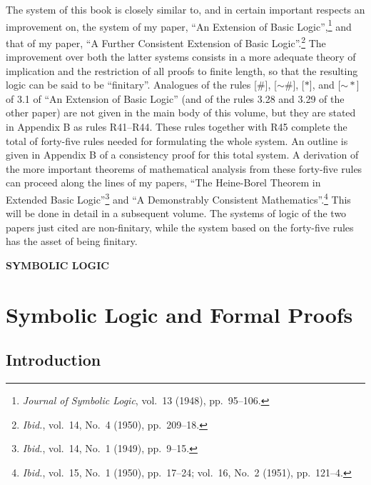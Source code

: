 \documentclass{book}
\renewcommand*{\neg}{\mathord{\sim}}
\begin{document}
The system of this book is closely similar to, and in certain important respects an improvement on, the system of my paper, “An Extension of Basic Logic”,\footnote{\textit{Journal of Symbolic Logic}, vol.\ 13 (1948), pp.\ 95–106.} and that of my paper, “A Further Consistent Extension of Basic Logic”.\footnote{\textit{Ibid.}, vol.\ 14, No.\ 4 (1950), pp.\ 209–18.}  The improvement over both the latter systems consists in a more adequate theory of implication and the restriction of all proofs to finite length, so that the resulting logic can be said to be “finitary”.  Analogues of the rules [\(\#\)], [\(\neg\#\)], [\(*\)], and [\(\neg *\)] of 3.1 of “An Extension of Basic Logic” (and of the rules 3.28 and 3.29 of the other paper) are not given in the main body of this volume, but they are stated in Appendix B as rules R41–R44.  These rules together with R45 complete the total of forty-five rules needed for formulating the whole system.  An outline is given in Appendix B of a consistency proof for this total system.  A derivation of the more important theorems of mathematical analysis from these forty-five rules can proceed along the lines of my papers, “The Heine-Borel Theorem in Extended Basic Logic”\footnote{\textit{Ibid.}, vol.\ 14, No.\ 1 (1949), pp.\ 9–15.} and “A Demonstrably Consistent Mathematics”.\footnote{\textit{Ibid.}, vol.\ 15, No.\ 1 (1950), pp.\ 17–24; vol.\ 16, No.\ 2 (1951), pp.\ 121–4.}  This will be done in detail in a subsequent volume.  The systems of logic of the two papers just cited are non-finitary, while the system based on the forty-five rules has the asset of being finitary.

\setcounter{tocdepth}{1}
\tableofcontents

\mainmatter
\pagestyle{headings}

\begin{center}
  \Large\bfseries\MakeUppercase{Symbolic Logic}
\end{center}

\thispagestyle{empty}
\clearpage
\thispagestyle{empty}
\cleardoublepage

\chapter{Symbolic Logic and Formal Proofs}
\label{ch:1}

\section{Introduction}
\label{sec:1}
\end{document}
